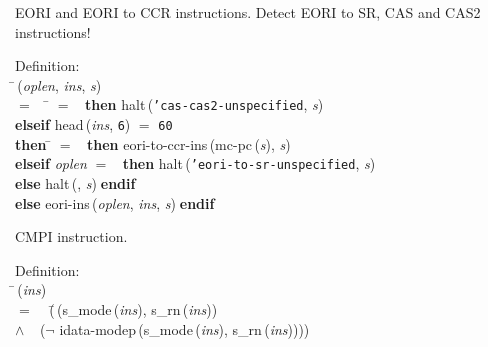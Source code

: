  EORI and EORI to CCR instructions.
 Detect EORI to SR, CAS and CAS2 instructions!
\begin{tabbing}{\sc Definition}: \\  
\=\,({\it{oplen\/}}, {\it{ins\/}}, {\it{s\/}}) \\ 
$=$$\;\;\;\;$\= $=$ {}$\;\;${\bf then }{\rm{halt}}\,({\tt{'}}{\tt{cas-cas2-unspecified}}, {\it{s\/}}) \\ 
{\bf elseif }{\rm{head}}\,({\it{ins\/}}, {\tt{6}}) $=$ {\tt{60}} \\ 
{\bf then }\= $=$ {}$\;\;${\bf then }{\rm{eori-to-ccr-ins}}\,({\rm{mc-pc}}\,({\it{s\/}}), {\it{s\/}}) \\ 
{\bf elseif }{\it{oplen\/}} $=$ {}$\;\;${\bf then }{\rm{halt}}\,({\tt{'}}{\tt{eori-to-sr-unspecified}}, {\it{s\/}}) \\ 
{\bf else }{\rm{halt}}\,({}, {\it{s\/}})$\;${\bf  endif}\- \\ 
{\bf else }{\rm{eori-ins}}\,({\it{oplen\/}}, {\it{ins\/}}, {\it{s\/}})$\;${\bf  endif}\-\-
\end{tabbing}

 CMPI instruction.
\begin{tabbing}{\sc Definition}: \\  
\=\,({\it{ins\/}}) \\ 
$=$$\;\;\;\;$(\=\,({\rm{s\_mode}}\,({\it{ins\/}}), {\rm{s\_rn}}\,({\it{ins\/}})) \\ 
$\wedge$$\;\;\;\;$($\neg$ {\rm{idata-modep}}\,({\rm{s\_mode}}\,({\it{ins\/}}), {\rm{s\_rn}}\,({\it{ins\/}}))))\-\-
\end{tabbing}

